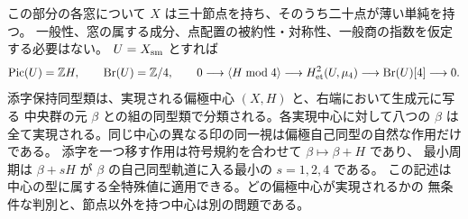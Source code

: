 \begin{theorem}\label{thm:nodal-center-special-values}
この部分の各窓について $X$ は三十節点を持ち、そのうち二十点が薄い単純を持つ。
一般性、窓の属する成分、点配置の被約性・対称性、一般商の指数を仮定する必要はない。
$U=X_{\rm sm}$ とすれば
\[
 \operatorname{Pic}(U)=\mathbb Z H,\qquad
 \operatorname{Br}(U)=\mathbb Z/4,\qquad
 0\longrightarrow \langle H\bmod4\rangle\longrightarrow
 H^2_{\rm et}(U,\mu_4)\longrightarrow\operatorname{Br}(U)[4]\longrightarrow0 .
\]
添字保持同型類は、実現される偏極中心 $(X,H)$ と、右端において生成元に写る
中央群の元 $\beta$ との組の同型類で分類される。各実現中心に対して八つの
$\beta$ は全て実現される。同じ中心の異なる印の同一視は偏極自己同型の自然な作用だけである。
添字を一つ移す作用は符号規約を合わせて $\beta\mapsto\beta+H$ であり、
最小周期は $\beta+sH$ が $\beta$ の自己同型軌道に入る最小の $s=1,2,4$ である。
この記述は中心の型に属する全特殊値に適用できる。どの偏極中心が実現されるかの
無条件な判別と、節点以外を持つ中心は別の問題である。
\end{theorem}
